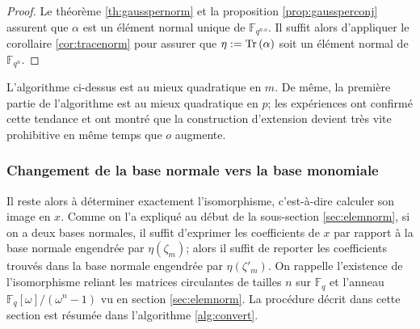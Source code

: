 \documentclass[a4paper]{article} %
\numberwithin{section}{part}
\numberwithin{equation}{section}
\newcommand\GF[1]{\mathbb{F}_{#1}}
\newcommand\Tr[1]{\textup{Tr}\left(#1\right)}
\begin{document}
\begin{proof}
Le théorème \ref{th:gausspernorm} et la proposition \ref{prop:gaussperconj}
assurent que $\alpha$ est un élément normal unique de $\GF{q^{n.o}}$. Il suffit 
alors d'appliquer le corollaire \ref{cor:tracenorm} pour assurer que $\eta :=
\Tr{\alpha}$ soit un élément normal de $\GF{q^n}$.
\end{proof}
\begin{rem}
L'algorithme ci-dessus est au mieux quadratique en $m$. De même, la première
partie de l'algorithme est au mieux quadratique en $p$; les expériences ont
confirmé cette tendance et ont montré que la construction d'extension devient
très vite prohibitive en même temps que $o$ augmente.
\end{rem}

\subsubsection*{Changement de la base normale vers la base monomiale}
Il reste alors à déterminer exactement l'isomorphisme, c'est-à-dire calculer son
image en $x$. Comme on l'a expliqué au début de la sous-section
\ref{sec:elemnorm}, si on a deux bases normales, il suffit d'exprimer les 
coefficients de $x$ par rapport à la base normale engendrée par $\eta(\zeta_m)$;
alors il suffit de reporter les coefficients trouvés dans la base normale 
engendrée par $\eta(\zeta'_m)$. On rappelle l'existence de l'isomorphisme 
reliant les matrices circulantes de tailles $n$ sur $\GF{q}$ et l'anneau 
$\GF{q}[\omega]/(\omega^n - 1)$ vu en section \ref{sec:elemnorm}. La procédure
décrit dans cette section est résumée dans l'algorithme \ref{alg:convert}.
\end{document}
